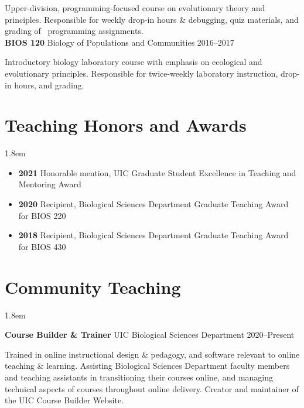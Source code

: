 \documentclass[]{article}
\begin{document}
Upper-division, programming-focused course on evolutionary theory and principles. Responsible for weekly drop-in hours \& debugging, quiz materials, and grading of \textcolor{light-gray}{\faRProject}\ programming assignments.\\

\textbf{BIOS 120} Biology of Populations and Communities \hfill 2016--2017
     
Introductory biology laboratory course with emphasis on ecological and evolutionary principles. \linebreak Responsible for twice-weekly laboratory instruction, drop-in hours, and grading.

\vspace{2mm}
\section{Teaching Honors and Awards}

\vspace{2mm}
\leftskip 1.8em

\begin{itemize}[label=$\mathwitch*$]
\item{\textbf{2021} Honorable mention, UIC Graduate Student Excellence in Teaching and Mentoring Award}
\item{\textbf{2020} Recipient, Biological Sciences Department Graduate Teaching Award for BIOS 220}
\item{\textbf{2018} Recipient, Biological Sciences Department Graduate Teaching Award for BIOS 430}
\end{itemize}


\clearpage
\pagestyle{alldocument}

\vspace{4mm}
\section{Community Teaching}
\vspace{2mm}
\leftskip 1.8em

\textbf{Course Builder \& Trainer} UIC Biological Sciences Department \hfill 2020--Present
     
Trained in online instructional design \& pedagogy, and software relevant to online teaching \& \linebreak learning. Assisting Biological Sciences Department faculty members and teaching assistants in transitioning their courses online, and managing technical aspects of courses throughout online delivery. Creator and maintainer of the UIC Course Builder Website. \href{https://www.ledelaney.org/cb-materials}{\faLink} \href{https://github.com/ledelaney/cb-materials}{\faGithub}\\
     
\end{document}
